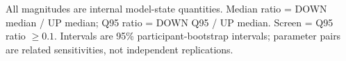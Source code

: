 \noindent\footnotesize All magnitudes are internal model-state quantities. Median ratio = DOWN median / UP median; Q95 ratio = DOWN Q95 / UP median. Screen = Q95 ratio $\geq 0.1$. Intervals are 95\% participant-bootstrap intervals; parameter pairs are related sensitivities, not independent replications.
\endgroup